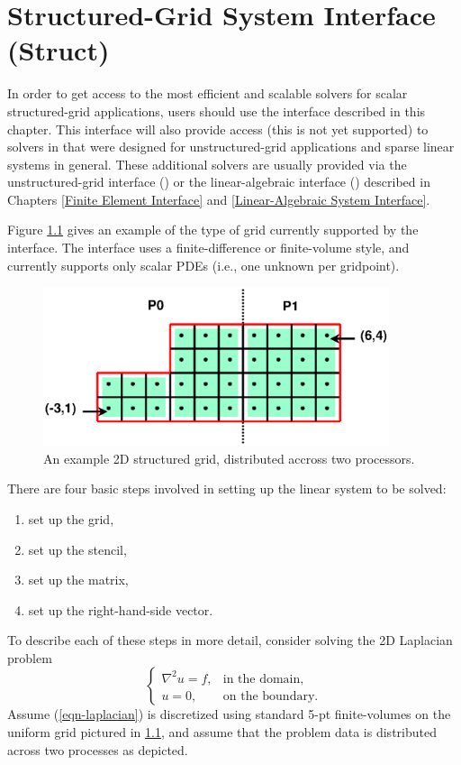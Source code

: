 \chapter{Structured-Grid System Interface (Struct)}
\label{Structured-Grid System Interface}

In order to get access to the most efficient and scalable solvers for
scalar structured-grid applications, users should use the
 interface described in this chapter.  This interface
will also provide access (this is not yet supported) to solvers in
\hypre{} that were designed for unstructured-grid applications and
sparse linear systems in general.  These additional solvers are
usually provided via the unstructured-grid interface () or
the linear-algebraic interface () described in Chapters
\ref{Finite Element Interface} and \ref{Linear-Algebraic System Interface}.

Figure \ref{fig-fv-grid} gives an example of the type of grid
currently supported by the  interface.  The interface
uses a finite-difference or finite-volume style, and currently
supports only scalar PDEs (i.e., one unknown per gridpoint).
\begin{figure}[t]
\centering
\includegraphics[width=4in]{fv_grid.eps}
\caption{%
An example 2D structured grid, distributed accross two processors.}
\label{fig-fv-grid}
\end{figure}
There are four basic steps involved in setting up the linear system
to be solved:
\begin{enumerate}
\item set up the grid,
\item set up the stencil,
\item set up the matrix,
\item set up the right-hand-side vector.
\end{enumerate}
To describe each of these steps in more detail, consider solving the
2D Laplacian problem
\begin{equation}\label{eqn-laplacian}
\left \{
\begin{array}{ll}
\nabla^2 u = f , & \mbox{in the domain}, \\
u = 0,           & \mbox{on the boundary}.
\end{array}
\right .
\end{equation}
Assume (\ref{eqn-laplacian}) is discretized using standard 5-pt
finite-volumes on the uniform grid pictured in \ref{fig-fv-grid}, and
assume that the problem data is distributed across two processes as
depicted.

